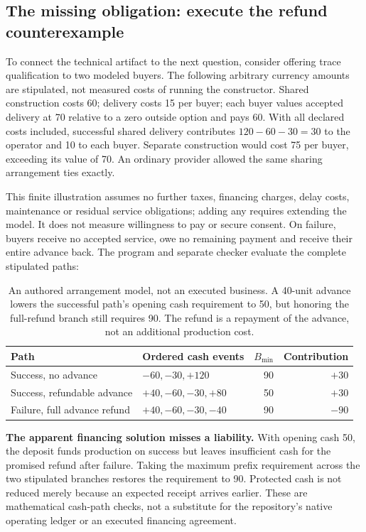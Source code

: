 \subsection{The missing obligation: execute the refund counterexample}
To connect the technical artifact to the next question, consider offering trace qualification to two modeled buyers. The following arbitrary currency amounts are stipulated, not measured costs of running the constructor. Shared construction costs 60; delivery costs 15 per buyer; each buyer values accepted delivery at 70 relative to a zero outside option and pays 60. With all declared costs included, successful shared delivery contributes $120-60-30=30$ to the operator and 10 to each buyer. Separate construction would cost 75 per buyer, exceeding its value of 70. An ordinary provider allowed the same sharing arrangement ties exactly.

This finite illustration assumes no further taxes, financing charges, delay costs, maintenance or residual service obligations; adding any requires extending the model. It does not measure willingness to pay or secure consent. On failure, buyers receive no accepted service, owe no remaining payment and receive their entire advance back. The program and separate checker evaluate the complete stipulated paths:

\begin{table}[htbp]
\small
\begin{tabularx}{\textwidth}{YP{1.66in}rr}
\toprule
\textbf{Path} & \textbf{Ordered cash events} & \textbf{$B_{\min}$} & \textbf{Contribution}\\
\midrule
Success, no advance & $-60,-30,+120$ & 90 & $+30$\\
Success, refundable advance & $+40,-60,-30,+80$ & 50 & $+30$\\
Failure, full advance refund & $+40,-60,-30,-40$ & 90 & $-90$\\
\bottomrule
\end{tabularx}
\caption{An authored arrangement model, not an executed business. A 40-unit advance lowers the successful path's opening cash requirement to 50, but honoring the full-refund branch still requires 90. The refund is a repayment of the advance, not an additional production cost.}
\label{tab:refund}
\end{table}

\textbf{The apparent financing solution misses a liability.} With opening cash 50, the deposit funds production on success but leaves insufficient cash for the promised refund after failure. Taking the maximum prefix requirement across the two stipulated branches restores the requirement to 90. Protected cash is not reduced merely because an expected receipt arrives earlier. These are mathematical cash-path checks, not a substitute for the repository's native operating ledger or an executed financing agreement.

